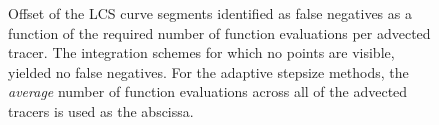 \begin{figure}[htpb]
    \centering
    
    \caption[Offset of the LCS curve segments identified as false negatives,
    as a function of the required number of function evaluations per advected tracer]
    {Offset of the LCS curve segments identified as false negatives as a
        function of the required number of function evaluations per advected tracer. The
        integration schemes for which no points are visible, yielded
        no false negatives. For the adaptive stepsize methods, the
        \emph{average} number of function evaluations across all of the advected
    tracers is used as the abscissa.}
    \label{fig:lcs_err_fn_fn}
\end{figure}
